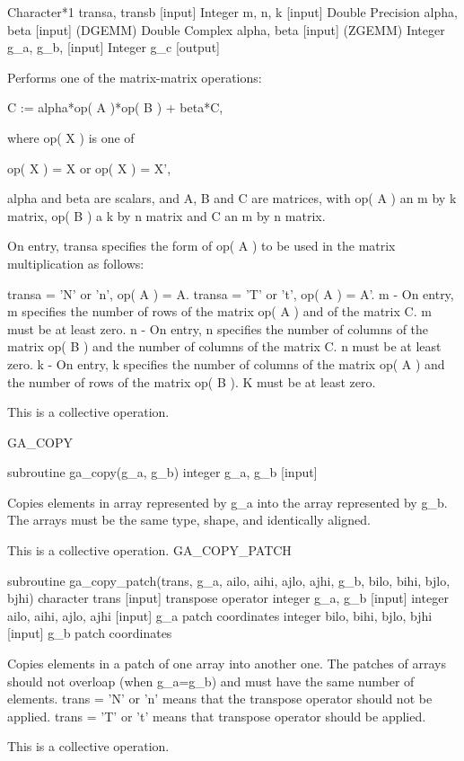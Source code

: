 Character{*}1 transa, transb {[}input{]} Integer m, n, k {[}input{]}
Double Precision alpha, beta {[}input{]} (DGEMM) Double Complex alpha,
beta {[}input{]} (ZGEMM) Integer g\_a, g\_b, {[}input{]} Integer g\_c
{[}output{]}

Performs one of the matrix-matrix operations:

C := alpha{*}op( A ){*}op( B ) + beta{*}C,

where op( X ) is one of

op( X ) = X or op( X ) = X',

alpha and beta are scalars, and A, B and C are matrices, with op(
A ) an m by k matrix, op( B ) a k by n matrix and C an m by n matrix.

On entry, transa specifies the form of op( A ) to be used in the matrix
multiplication as follows:

transa = 'N' or 'n', op( A ) = A. transa = 'T' or 't', op( A ) = A'.
m - On entry, m specifies the number of rows of the matrix op( A )
and of the matrix C. m must be at least zero. n - On entry, n specifies
the number of columns of the matrix op( B ) and the number of columns
of the matrix C. n must be at least zero. k - On entry, k specifies
the number of columns of the matrix op( A ) and the number of rows
of the matrix op( B ). K must be at least zero.

This is a collective operation.

GA\_COPY

subroutine ga\_copy(g\_a, g\_b) integer g\_a, g\_b {[}input{]}

Copies elements in array represented by g\_a into the array represented
by g\_b. The arrays must be the same type, shape, and identically
aligned.

This is a collective operation. GA\_COPY\_PATCH

subroutine ga\_copy\_patch(trans, g\_a, ailo, aihi, ajlo, ajhi, g\_b,
bilo, bihi, bjlo, bjhi) character trans {[}input{]} transpose operator
integer g\_a, g\_b {[}input{]} integer ailo, aihi, ajlo, ajhi {[}input{]}
g\_a patch coordinates integer bilo, bihi, bjlo, bjhi {[}input{]}
g\_b patch coordinates

Copies elements in a patch of one array into another one. The patches
of arrays should not overloap (when g\_a=g\_b) and must have the same
number of elements. trans = 'N' or 'n' means that the transpose operator
should not be applied. trans = 'T' or 't' means that transpose operator
should be applied.

This is a collective operation.

